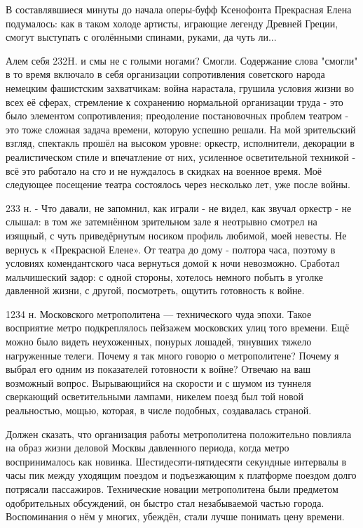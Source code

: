 В составлявшиеся минуты до начала оперы-буфф Ксенофонта Прекрасная Елена подумалось: как в таком холоде артисты, играющие легенду Древней Греции, смогут выступать с оголёнными спинами, руками, да чуть ли...

Алем себя 232H. и смы не с голыми ногами? Смогли. Содержание слова "смогли" в то время включало в себя организации сопротивления советского народа немецким фашистским захватчикам: война нарастала, грушила условия жизни во всех её сферах, стремление к сохранению нормальной организации труда - это было элементом сопротивления; преодоление постановочных проблем театром - это тоже сложная задача времени, которую успешно решали. На мой зрительский взгляд, спектакль прошёл на высоком уровне: оркестр, исполнители, декорации в реалистическом стиле и впечатление от них, усиленное осветительной техникой - всё это работало на сто и не нуждалось в скидках на военное время. Моё следующее посещение театра состоялось через несколько лет, уже после войны.

233 н.
- Что давали, не запомнил, как играли - не видел, как звучал оркестр - не слышал: в том же затемнённом зрительном зале я неотрывно смотрел на изящный, с чуть приведёрнутым носиком профиль любимой, моей невесты. Не вернусь к «Прекрасной Елене».
От театра до дому - полтора часа, поэтому в условиях комендантского часа вернуться домой к ночи невозможно. Сработал мальчишеский задор: с одной стороны, хотелось немного побыть в уголке давленной жизни, с другой, посмотреть, ощутить готовность к войне.

1234 н.
Московского метрополитена — технического чуда эпохи. Такое восприятие метро подкреплялось пейзажем московских улиц того времени. Ещё можно было видеть неухоженных, понурых лошадей, тянувших тяжело нагруженные телеги.
Почему я так много говорю о метрополитене? Почему я выбрал его одним из показателей готовности к войне? Отвечаю на ваш возможный вопрос. Вырывающийся на скорости и с шумом из туннеля сверкающий осветительными лампами, никелем поезд был той новой реальностью, мощью, которая, в числе подобных, создавалась страной.

Должен сказать, что организация работы метрополитена положительно повлияла на образ жизни деловой Москвы давленного периода, когда метро воспринималось как новинка. Шестидесяти-пятидесяти секундные интервалы в часы пик между уходящим поездом и подъезжающим к платформе поездом долго потрясали пассажиров. Технические новации метрополитена были предметом одобрительных обсуждений, он быстро стал незабываемой частью города. Воспоминания о нём у многих, убеждён, стали лучше понимать цену времени.

